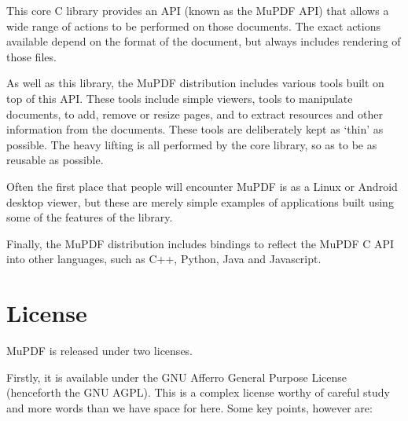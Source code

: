 \documentclass[oneside]{book}
\begin{document}
This core C library provides an API (known as the MuPDF API) that allows a wide range of actions to be performed on those documents. The exact actions available depend on the format of the document, but always includes rendering of those files.

As well as this library, the MuPDF distribution includes various tools built on top of this API. These tools include simple viewers, tools to manipulate documents, to add, remove or resize pages, and to extract resources and other information from the documents. These tools are deliberately kept as `thin' as possible. The heavy lifting is all performed by the core library, so as to be as reusable as possible.

Often the first place that people will encounter MuPDF is as a Linux or Android desktop viewer, but these are merely simple examples of applications built using some of the features of the library.

Finally, the MuPDF distribution includes bindings to reflect the MuPDF C API into other languages, such as C++, Python, Java and Javascript.


\section{License}

MuPDF is released under two licenses.

Firstly, it is available under the GNU Afferro General Purpose License (henceforth the GNU AGPL). This is a complex license worthy of careful study and more words than we have space for here. Some key points, however are:
\end{document}
